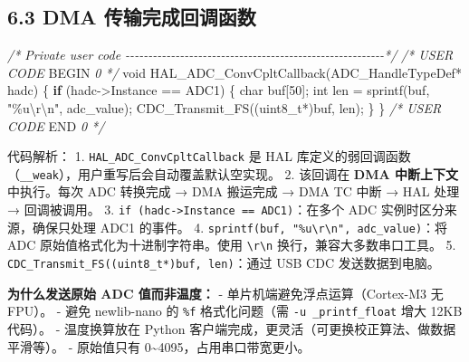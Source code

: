 \documentclass[
  chinese,
  UTF8,
  oneside,
  openany]{ctexbook}
\newenvironment{Shaded}{}{}
\newcommand{\CommentTok}[1]{\textcolor[rgb]{0.38,0.63,0.69}{\textit{#1}}}
\newcommand{\ControlFlowTok}[1]{\textcolor[rgb]{0.00,0.44,0.13}{\textbf{#1}}}
\newcommand{\DataTypeTok}[1]{\textcolor[rgb]{0.56,0.13,0.00}{#1}}
\newcommand{\DecValTok}[1]{\textcolor[rgb]{0.25,0.63,0.44}{#1}}
\newcommand{\NormalTok}[1]{#1}
\newcommand{\OperatorTok}[1]{\textcolor[rgb]{0.40,0.40,0.40}{#1}}
\newcommand{\RegionMarkerTok}[1]{#1}
\newcommand{\SpecialCharTok}[1]{\textcolor[rgb]{0.25,0.44,0.63}{#1}}
\newcommand{\StringTok}[1]{\textcolor[rgb]{0.25,0.44,0.63}{#1}}
\begin{document}
\subsection{6.3 DMA
传输完成回调函数}\label{dma-ux4f20ux8f93ux5b8cux6210ux56deux8c03ux51fdux6570}

\begin{Shaded}
\begin{Highlighting}[]
\CommentTok{/* Private user code {-}{-}{-}{-}{-}{-}{-}{-}{-}{-}{-}{-}{-}{-}{-}{-}{-}{-}{-}{-}{-}{-}{-}{-}{-}{-}{-}{-}{-}{-}{-}{-}{-}{-}{-}{-}{-}{-}{-}{-}{-}{-}{-}{-}{-}{-}{-}{-}{-}{-}{-}{-}{-}{-}{-}{-}{-}*/}
\CommentTok{/* USER CODE }\RegionMarkerTok{BEGIN}\CommentTok{ 0 */}
\DataTypeTok{void}\NormalTok{ HAL\_ADC\_ConvCpltCallback}\OperatorTok{(}\NormalTok{ADC\_HandleTypeDef}\OperatorTok{*}\NormalTok{ hadc}\OperatorTok{)}
\OperatorTok{\{}
    \ControlFlowTok{if} \OperatorTok{(}\NormalTok{hadc}\OperatorTok{{-}\textgreater{}}\NormalTok{Instance }\OperatorTok{==}\NormalTok{ ADC1}\OperatorTok{)}
    \OperatorTok{\{}
        \DataTypeTok{char}\NormalTok{ buf}\OperatorTok{[}\DecValTok{50}\OperatorTok{];}
        \DataTypeTok{int}\NormalTok{ len }\OperatorTok{=}\NormalTok{ sprintf}\OperatorTok{(}\NormalTok{buf}\OperatorTok{,} \StringTok{"}\SpecialCharTok{\%u\textbackslash{}r\textbackslash{}n}\StringTok{"}\OperatorTok{,}\NormalTok{ adc\_value}\OperatorTok{);}
\NormalTok{        CDC\_Transmit\_FS}\OperatorTok{((}\DataTypeTok{uint8\_t}\OperatorTok{*)}\NormalTok{buf}\OperatorTok{,}\NormalTok{ len}\OperatorTok{);}
    \OperatorTok{\}}
\OperatorTok{\}}
\CommentTok{/* USER CODE }\RegionMarkerTok{END}\CommentTok{ 0 */}
\end{Highlighting}
\end{Shaded}

代码解析： 1. \texttt{HAL\_ADC\_ConvCpltCallback} 是 HAL
库定义的弱回调函数（\texttt{\_\_weak}），用户重写后会自动覆盖默认空实现。
2. 该回调在 \textbf{DMA 中断上下文}中执行。每次 ADC 转换完成 → DMA
搬运完成 → DMA TC 中断 → HAL 处理 → 回调被调用。 3.
\texttt{if\ (hadc-\textgreater{}Instance\ ==\ ADC1)}：在多个 ADC
实例时区分来源，确保只处理 ADC1 的事件。 4.
\texttt{sprintf(buf,\ "\%u\textbackslash{}r\textbackslash{}n",\ adc\_value)}：将
ADC 原始值格式化为十进制字符串。使用
\texttt{\textbackslash{}r\textbackslash{}n} 换行，兼容大多数串口工具。
5. \texttt{CDC\_Transmit\_FS((uint8\_t*)buf,\ len)}：通过 USB CDC
发送数据到电脑。

\textbf{为什么发送原始 ADC 值而非温度：} -
单片机端避免浮点运算（Cortex-M3 无 FPU）。 - 避免 newlib-nano 的
\texttt{\%f} 格式化问题（需 \texttt{-u\ \_printf\_float} 增大 12KB
代码）。 - 温度换算放在 Python
客户端完成，更灵活（可更换校正算法、做数据平滑等）。 - 原始值只有
0\textasciitilde4095，占用串口带宽更小。
\end{document}
